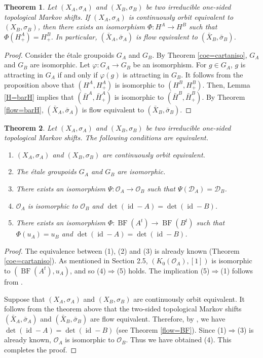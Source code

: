 \documentclass[11pt]{article}
\newtheorem{theorem}{Theorem}[section]
\theoremstyle{definition}
\numberwithin{equation}{section}
\renewcommand{\phi}{\varphi}
\newcommand{\BF}{\operatorname{BF}}
\newcommand{\id}{\operatorname{id}}
\begin{document}
\begin{theorem}\label{coe>fe}
Let $(X_A,\sigma_A)$ and $(X_B,\sigma_B)$ be 
two irreducible one-sided topological Markov shifts. 
If $(X_A,\sigma_A)$ is continuously orbit equivalent to $(X_B,\sigma_B)$, 
then there exists an isomorphism $\Phi:H^A\to H^B$ 
such that $\Phi(H^A_+)=H^B_+$. 
In particular, 
$(\bar X_A,\bar\sigma_A)$ is flow equivalent to $(\bar X_B,\bar\sigma_B)$. 
\end{theorem}
\begin{proof}
Consider the \'etale groupoids $G_A$ and $G_B$. 
By Theorem \ref{coe=cartaniso}, $G_A$ and $G_B$ are isomorphic. 
Let $\phi:G_A\to G_B$ be an isomorphism. 
For $g\in G_A$, 
$g$ is attracting in $G_A$ if and only if $\phi(g)$ is attracting in $G_B$. 
It follows from the proposition above that 
$(H^A,H^A_+)$ is isomorphic to $(H^B,H^B_+)$. 
Then, Lemma \ref{H=barH} implies that 
$(\bar H^A,\bar H^A_+)$ is isomorphic to $(\bar H^B,\bar H^B_+)$. 
By Theorem \ref{flow=barH}, 
$(\bar X_A,\bar\sigma_A)$ is flow equivalent to $(\bar X_B,\bar\sigma_B)$. 
\end{proof}

\begin{theorem}\label{classification}
Let $(X_A,\sigma_A)$ and $(X_B,\sigma_B)$ be 
two irreducible one-sided topological Markov shifts. 
The following conditions are equivalent. 
\begin{enumerate}
\item $(X_A,\sigma_A)$ and $(X_B,\sigma_B)$ are 
continuously orbit equivalent. 
\item The \'etale groupoids $G_A$ and $G_B$ are isomorphic. 
\item There exists an isomorphism $\Psi:\mathcal{O}_A\to\mathcal{O}_B$ 
such that $\Psi(\mathcal{D}_A)=\mathcal{D}_B$. 
\item $\mathcal{O}_A$ is isomorphic to $\mathcal{O}_B$ 
and $\det(\id-A)=\det(\id-B)$. 
\item There exists an isomorphism $\Phi:\BF(A^t)\to\BF(B^t)$ 
such that $\Phi(u_A)=u_B$ and $\det(\id-A)=\det(\id-B)$. 
\end{enumerate}
\end{theorem}
\begin{proof}
The equivalence between (1), (2) and (3) is already known 
(Theorem \ref{coe=cartaniso}). 
As mentioned in Section 2.5, 
$(K_0(\mathcal{O}_A),[1])$ is isomorphic to $(\BF(A^t),u_A)$, 
and so (4)$\Rightarrow$(5) holds. 
The implication (5)$\Rightarrow$(1) follows 
from \cite[Theorem 1.1]{Matsumoto13PAMS}. 

Suppose that $(X_A,\sigma_A)$ and $(X_B,\sigma_B)$ are 
continuously orbit equivalent. 
It follows from the theorem above that 
the two-sided topological Markov shifts 
$(\bar X_A,\bar\sigma_A)$ and $(\bar X_B,\bar\sigma_B)$ are flow equivalent. 
Therefore, by \cite{PS75Top}, we have $\det(\id-A)=\det(\id-B)$ 
(see Theorem \ref{flow=BF}). 
Since (1)$\Rightarrow$(3) is already known, 
$\mathcal{O}_A$ is isomorphic to $\mathcal{O}_B$. 
Thus we have obtained (4). 
This completes the proof. 
\end{proof}
\end{document}
